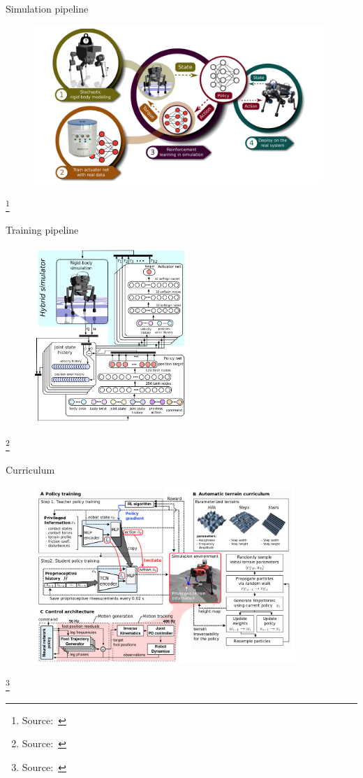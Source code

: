 \documentclass[11pt, aspectratio=169]{beamer}
\newcommand\blfootnote[1]{%
  \begingroup
  \renewcommand\thefootnote{}%
  \footnote{#1}%
  \addtocounter{footnote}{-1}%
  \endgroup
}
\begin{document}
\begin{frame}{Simulation pipeline}
    \begin{figure}
        \includegraphics[height=6cm]{figures/quadruped-sim-pipeline.png}
    \end{figure}
    \blfootnote{
        Source:~\cite{hwangbo2019}
    }
\end{frame}

\begin{frame}{Training pipeline}
    \begin{figure}
        \includegraphics[height=6.7cm]{figures/quadruped-training.png}
    \end{figure}
    \vspace{-0.7cm}
    \blfootnote{
        Source:~\cite{hwangbo2019}
    }
\end{frame}

\begin{frame}{Curriculum}
    \begin{figure}
        \includegraphics[height=6.7cm]{figures/quadruped-curriculum.png}
    \end{figure}
    \vspace{-0.7cm}
    \blfootnote{
        Source:~\cite{lee2020}
    }
\end{frame}
\end{document}
